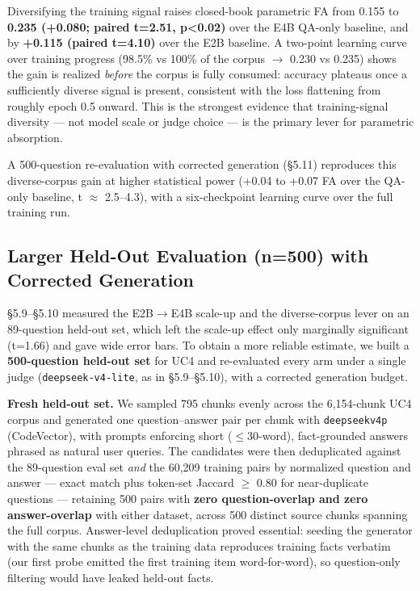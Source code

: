 \documentclass[10pt,twocolumn]{article}
\begin{document}
Diversifying the training signal raises closed-book parametric FA from 0.155 to \textbf{0.235 (+0.080; paired t=2.51, p<0.02)} over the E4B QA-only baseline, and by \textbf{+0.115 (paired t=4.10)} over the E2B baseline. A two-point learning curve over training progress (98.5\% vs 100\% of the corpus $\to$ 0.230 vs 0.235) shows the gain is realized \textit{before} the corpus is fully consumed: accuracy plateaus once a sufficiently diverse signal is present, consistent with the loss flattening from roughly epoch 0.5 onward. This is the strongest evidence that training-signal diversity --- not model scale or judge choice --- is the primary lever for parametric absorption.


A 500-question re-evaluation with corrected generation (\S{}5.11) reproduces this diverse-corpus gain at higher statistical power (+0.04 to +0.07 FA over the QA-only baseline, t $\approx$ 2.5--4.3), with a six-checkpoint learning curve over the full training run.


\subsection{Larger Held-Out Evaluation (n=500) with Corrected Generation}

\S{}5.9--\S{}5.10 measured the E2B$\to$E4B scale-up and the diverse-corpus lever on an 89-question held-out set, which left the scale-up effect only marginally significant (t=1.66) and gave wide error bars. To obtain a more reliable estimate, we built a \textbf{500-question held-out set} for UC4 and re-evaluated every arm under a single judge (\texttt{deepseek-v4-lite}, as in \S{}5.9--\S{}5.10), with a corrected generation budget.


\textbf{Fresh held-out set.} We sampled 795 chunks evenly across the 6,154-chunk UC4 corpus and generated one question--answer pair per chunk with \texttt{deepseekv4p} (CodeVector), with prompts enforcing short ($\leq$30-word), fact-grounded answers phrased as natural user queries. The candidates were then deduplicated against the 89-question eval set \textit{and} the 60,209 training pairs by normalized question and answer --- exact match plus token-set Jaccard $\geq$ 0.80 for near-duplicate questions --- retaining 500 pairs with \textbf{zero question-overlap and zero answer-overlap} with either dataset, across 500 distinct source chunks spanning the full corpus. Answer-level deduplication proved essential: seeding the generator with the same chunks as the training data reproduces training facts verbatim (our first probe emitted the first training item word-for-word), so question-only filtering would have leaked held-out facts.
\end{document}
